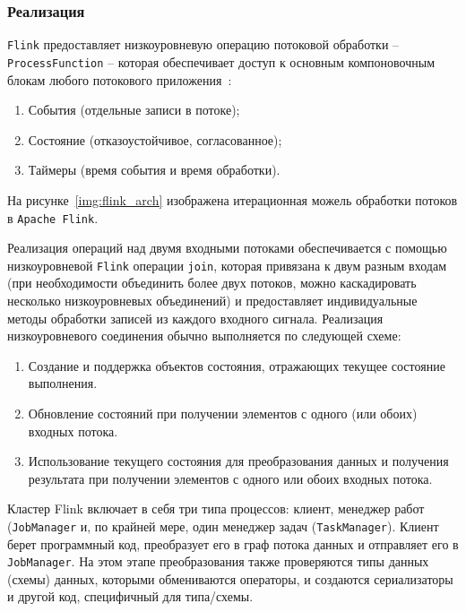 \subsubsection{Реализация}

\texttt{Flink} предоставляет низкоуровневую операцию потоковой обработки -- \texttt{ProcessFunction} -- которая обеспечивает доступ к основным компоновочным блокам любого потокового приложения~\cite{flink-oreilly}:
\begin{enumerate}
  \item События (отдельные записи в потоке);
  \item Состояние (отказоустойчивое, согласованное);
  \item Таймеры (время события и время обработки).
\end{enumerate}

На рисунке~\ref{img:flink_arch} изображена итерационная можель обработки потоков в \texttt{Apache Flink}.

Реализация операций над двумя входными потоками обеспечивается с помощью низкоуровневой \texttt{Flink} операции \texttt{join}, которая привязана к двум разным входам (при необходимости объединить более двух потоков, можно каскадировать несколько низкоуровневых объединений) и предоставляет индивидуальные методы обработки записей из каждого входного сигнала. 
Реализация низкоуровневого соединения обычно выполняется по следующей схеме:
\begin{enumerate}
  \item Создание и поддержка объектов состояния, отражающих текущее состояние выполнения.
  \item Обновление состояний при получении элементов с одного (или обоих) входных потока.
  \item Использование текущего состояния для преобразования данных и получения результата при получении элементов с одного или обоих входных потока.
\end{enumerate}

Кластер Flink включает в себя три типа процессов: клиент, менеджер работ (\texttt{JobManager} и, по крайней мере, один менеджер задач (\texttt{TaskManager}). Клиент берет программный код, преобразует его в граф потока данных и отправляет его в \texttt{JobManager}. На этом этапе преобразования также проверяются типы данных (схемы) данных, которыми обмениваются операторы, и создаются сериализаторы и другой код, специфичный для типа/схемы. 

